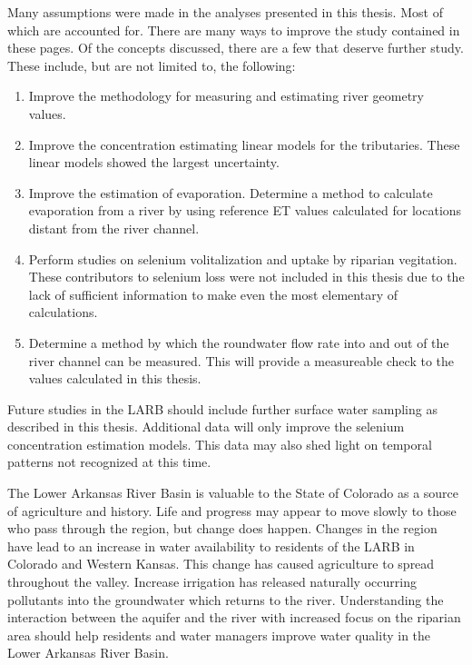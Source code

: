 \begin{linenumbers}
Many assumptions were made in the analyses presented in this thesis.  Most of which are accounted for.  There are many ways to improve the study contained in these pages.  Of the concepts discussed, there are a few that deserve further study.  These include, but are not limited to, the following:
\begin{enumerate}
	\item Improve the methodology for measuring and estimating river geometry values.
	\item Improve the concentration estimating linear models for the tributaries.  These linear models showed the largest uncertainty.
	\item Improve the estimation of evaporation.  Determine a method to calculate evaporation from a river by using reference ET values calculated for locations distant from the river channel.
	\item Perform studies on selenium volitalization and uptake by riparian vegitation.  These contributors to selenium loss were not included in this thesis due to the lack of sufficient information to make even the most elementary of calculations.
	\item Determine a method by which the roundwater flow rate into and out of the river channel can be measured.  This will provide a measureable check to the values calculated in this thesis.
\end{enumerate}

Future studies in the LARB should include further surface water sampling as described in this thesis.  Additional data will only improve the selenium concentration estimation models.  This data may also shed light on temporal patterns not recognized at this time.

The Lower Arkansas River Basin is valuable to the State of Colorado as a source of agriculture and history.  Life and progress may appear to move slowly to those who pass through the region, but change does happen.  Changes in the region have lead to an increase in water availability to residents of the LARB in Colorado and Western Kansas.  This change has caused agriculture to spread throughout the valley.  Increase irrigation has released naturally occurring pollutants into the groundwater which returns to the river.  Understanding the interaction between the aquifer and the river with increased focus on the riparian area should help residents and water managers improve water quality in the Lower Arkansas River Basin.

\clearpage{}
\end{linenumbers}